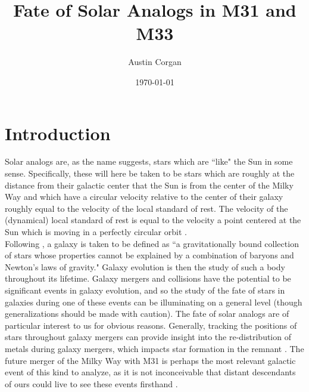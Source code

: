 \documentclass{aastex63}
\begin{document}
\title{Fate of Solar Analogs in M31 and M33}

\author{Austin Corgan}
\date{\today}


\section{Introduction}

Solar analogs are, as the name suggests, stars which are ``like" the Sun in some sense. Specifically, these will here be taken to be stars which are roughly at the distance from their galactic center that the Sun is from the center of the Milky Way and which have a circular velocity relative to the center of their galaxy roughly equal to the velocity of the local standard of rest. The velocity of the (dynamical) local standard of rest is equal to the velocity a point centered at the Sun which is moving in a perfectly circular orbit \citep{carroll96}. \\ 
\indent Following \cite{willman12}, a galaxy is taken to be defined as ``a gravitationally bound collection of stars whose properties cannot be explained by a combination of baryons and Newton's laws of gravity." Galaxy evolution is then the study of such a body throughout its lifetime. Galaxy mergers and collisions have the potential to be significant events in galaxy evolution, and so the study of the fate of stars in galaxies during one of these events can be illuminating on a general level (though generalizations should be made with caution). The fate of solar analogs are of particular interest to us for obvious reasons. Generally, tracking the positions of stars throughout galaxy mergers can provide insight into the re-distribution of metals during galaxy mergers, which impacts star formation in the remnant \citep{torrey12}. The future merger of the Milky Way with M31 is perhaps the most relevant galactic event of this kind to analyze, as it is not inconceivable that distant descendants of ours could live to see these events firsthand \citep{cox08}. \\
\end{document}
